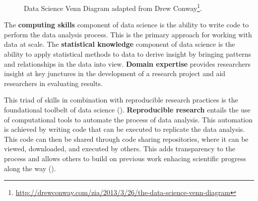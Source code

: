 \documentclass[
  letterpaper,
]{latex/krantz}
\theoremstyle{definition}
\theoremstyle{remark}
\DeclareRobustCommand{\href}[2]{#2\footnote{\url{#1}}}
\begin{document}
\begin{figure}[H]


\caption{\label{fig-intro-data-science-venn}Data Science Venn Diagram
adapted from
\href{http://drewconway.com/zia/2013/3/26/the-data-science-venn-diagram}{Drew
Conway}.}

\end{figure}%

The \textbf{computing skills} component of data
science is the ability to write code to perform the data analysis
process. This is the primary approach for working with data at scale.
The \textbf{statistical knowledge}
component of data science is the ability to apply statistical methods to
data to derive insight by bringing patterns and relationships in the
data into view. \textbf{Domain expertise}
provides researchers insight at key junctures in the development of a
research project and aid researchers in evaluating results.

This triad of skills in combination with reproducible research practices
is the foundational toolbelt of data science
(). \textbf{Reproducible
research} entails the use of computational
tools to automate the process of data analysis. This automation is
achieved by writing code that can be executed to replicate the data
analysis. This code can then be shared through code sharing
repositories, where it can be viewed, downloaded, and executed by
others. This adds transparency to the process and allows others to build
on previous work enhacing scientific progress along the way
().
\end{document}
